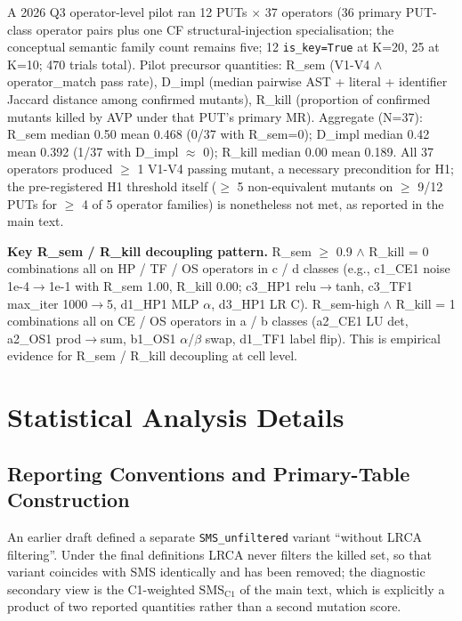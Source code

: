 \documentclass[review,12pt,authoryear]{elsarticle}
\newcounter{none}                   %
\begin{document}
A 2026 Q3 operator-level pilot ran 12 PUTs $\times$ 37 operators (36
primary PUT-class operator pairs plus one CF structural-injection
specialisation; the conceptual semantic family count remains five; 12
\texttt{is\_key=True} at K=20, 25 at K=10; 470 trials total). Pilot
precursor quantities: R\_sem (V1-V4 $\wedge$ operator\_match pass rate),
D\_impl (median pairwise AST + literal + identifier Jaccard distance
among confirmed mutants), R\_kill (proportion of confirmed mutants
killed by AVP under that PUT's primary MR). Aggregate (N=37): R\_sem
median 0.50 mean 0.468 (0/37 with R\_sem=0); D\_impl median 0.42 mean
0.392 (1/37 with D\_impl $\approx$ 0); R\_kill median 0.00 mean 0.189. All 37
operators produced $\geq$ 1 V1-V4 passing mutant, a necessary
precondition for H1; the pre-registered H1 threshold itself ($\geq$ 5
non-equivalent mutants on $\geq$ 9/12 PUTs for $\geq$ 4 of 5 operator
families) is nonetheless not met, as reported in the main text.

\textbf{Key R\_sem / R\_kill decoupling pattern.} R\_sem $\geq$ 0.9 $\wedge$ R\_kill
= 0 combinations all on HP / TF / OS operators in c / d classes (e.g.,
c1\_CE1 noise 1e-4$\to$1e-1 with R\_sem 1.00, R\_kill 0.00; c3\_HP1
relu$\to$tanh, c3\_TF1 max\_iter 1000$\to$5, d1\_HP1 MLP $\alpha$, d3\_HP1 LR C).
R\_sem-high $\wedge$ R\_kill = 1 combinations all on CE / OS operators in a / b
classes (a2\_CE1 LU det, a2\_OS1 prod$\to$sum, b1\_OS1 $\alpha$/$\beta$ swap, d1\_TF1
label flip). This is empirical evidence for R\_sem / R\_kill decoupling at cell level.


\section{Statistical Analysis Details}\label{d.-statistical-analysis-details}

\subsection{Reporting Conventions and Primary-Table Construction}\label{d.1-sms-variants-and-construction-lemmas}

An earlier draft defined a separate \texttt{SMS\_unfiltered} variant
``without LRCA filtering''. Under the final definitions LRCA never
filters the killed set, so that variant coincides with SMS identically
and has been removed; the diagnostic secondary view is the C1-weighted
$\mathrm{SMS}_{\mathrm{C1}}$ of the main text, which is explicitly a
product of two reported quantities rather than a second mutation score.
\end{document}

